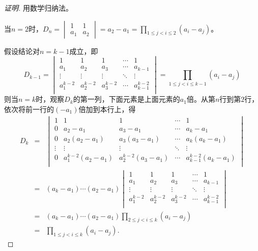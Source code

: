 \documentclass[a4paper]{book}
\begin{document}
\begin{proof}[证明]
用数学归纳法。

当$n=2$时，$D_n = \begin{vmatrix} 1 & 1\\ a_1 & a_2 \end{vmatrix} = a_2 - a_1 = \prod_{1\leqslant j < i \leqslant 2} (a_i - a_j)$。

假设结论对$n=k-1$成立，即
$$D_{k-1} = \begin{vmatrix}
1 & 1 & 1 & \cdots & 1 \\
a_1 & a_2 & a_3 & \cdots & a_{k-1} \\
\vdots & \vdots & \vdots & \ddots & \vdots \\
a_1^{k-2} & a_2^{k-2} & a_3^{k-2} & \cdots & a_{k-1}^{k-2} \\
\end{vmatrix} = \prod_{1\leqslant j < i \leqslant k-1} (a_i - a_j)$$
则当$n=k$时，观察$D_k$的第一列，下面元素是上面元素的$a_1$倍。从第$n$行到第$2$行，依次将前一行的$(-a_1)$倍加到本行上，得
\begin{eqnarray*}
D_{k} & = & \begin{vmatrix}
1 & 1 & 1 & \cdots & 1 \\
0 & a_2-a_1 & a_3-a_1 & \cdots & a_k-a_1 \\
0 & a_2(a_2-a_1) & a_3(a_3-a_1) & \cdots & a_k(a_k-a_1) \\
\vdots & \vdots & \vdots & \ddots & \vdots \\
0 & a_1^{k-2}(a_2-a_1) & a_2^{k-2}(a_3-a_1) & \cdots & a_{k-1}^{k-2}(a_k-a_1) \\
\end{vmatrix} \\
& = & (a_k - a_1)\cdots(a_2-a_1)\begin{vmatrix}
1 & 1 & 1 & \cdots & 1 \\
a_1 & a_2 & a_3 & \cdots & a_{k-1} \\
\vdots & \vdots & \vdots & \ddots & \vdots \\
a_1^{k-2} & a_2^{k-2} & a_3^{k-2} & \cdots & a_{k-1}^{k-2} \\
\end{vmatrix} \\
& = & (a_k - a_1)\cdots(a_2-a_1)\prod_{2\leqslant j < i \leqslant k} (a_i - a_j) \\
& = & \prod_{1\leqslant j < i \leqslant k} (a_i - a_j).
\end{eqnarray*}
\end{proof}
\end{document}
